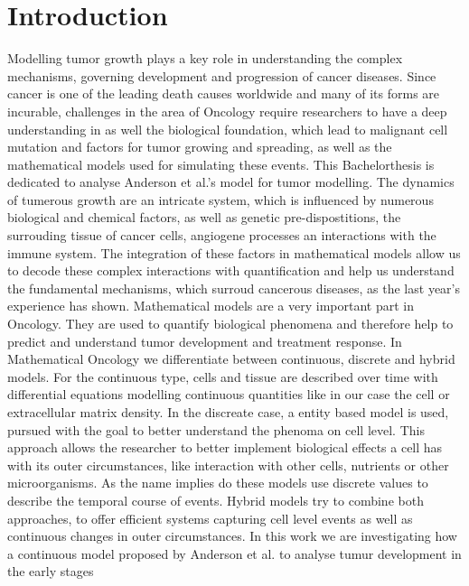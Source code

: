 \section{Introduction}
Modelling tumor growth plays a key role in understanding the complex mechanisms, 
governing development and progression of cancer diseases. Since cancer is one of the 
leading death causes worldwide and many of its forms are incurable, challenges in the area of 
Oncology require researchers to have a deep understanding in as well the biological foundation, 
which lead to malignant cell mutation and factors for tumor growing and spreading, as well as the 
mathematical models used for simulating these events. This Bachelorthesis is dedicated to 
analyse Anderson et al.'s \cite{anderson_continuous_1998,anderson_mathematical_2000} model for 
tumor modelling.\newline
The dynamics of tumerous growth are an intricate system, which is influenced by numerous biological and 
chemical factors, as well as genetic pre-dispostitions, the surrouding tissue of cancer cells, angiogene 
processes an interactions with the immune system. The integration of these factors in mathematical models
allow us to decode these complex interactions with quantification and help us understand the fundamental 
mechanisms, which surroud cancerous diseases, as the last year's experience has shown. \newline 
Mathematical models are a very important part in Oncology. They are used to quantify biological phenomena and therefore help to predict and understand tumor development and treatment response. In Mathematical Oncology we differentiate between continuous, discrete and hybrid models. For the continuous type, cells and tissue are described over time with differential equations modelling continuous quantities like in our case the cell or extracellular matrix density. In the discreate case, a entity based model is used, pursued with the goal to better understand the phenoma on cell level. This approach allows the researcher to better implement biological effects a cell has with its outer circumstances, like interaction with other cells, nutrients or other microorganisms. As the name implies do these models use discrete values to describe the temporal course of events. Hybrid models try to combine both approaches, to offer efficient systems capturing cell level events as well as continuous changes in outer circumstances.\newline 
In this work we are investigating how a continuous model proposed by Anderson et al. \cite{anderson_continuous_1998,anderson_mathematical_2000} to analyse tumur development in the early stages

